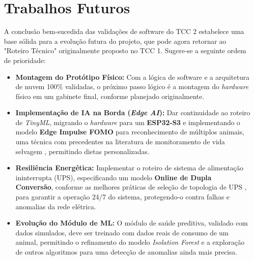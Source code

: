 \section{Trabalhos Futuros}
A conclusão bem-sucedida das validações de software do TCC 2 estabelece uma base sólida para a evolução futura do projeto, que pode agora retornar ao "Roteiro Técnico" originalmente proposto no TCC 1.
Sugere-se a seguinte ordem de prioridade:

\begin{itemize}
    \item \textbf{Montagem do Protótipo Físico:} Com a lógica de software e a arquitetura de nuvem 100\% validadas, o próximo passo lógico é a montagem do \textit{hardware} físico em um gabinete final, conforme planejado originalmente.
    
\item \textbf{Implementação de IA na Borda (\textit{Edge AI}):} Dar continuidade ao roteiro de \textit{TinyML}, migrando o \textit{hardware} para um \textbf{ESP32-S3} e implementando o modelo \textbf{Edge Impulse FOMO} para reconhecimento de múltiplos animais, uma técnica com precedentes na literatura de monitoramento de vida selvagem \cite{lindqvist2023_edge_ml, yolov5_wildlife_detection}, permitindo dietas personalizadas.

\item \textbf{Resiliência Energética:} Implementar o roteiro de sistema de alimentação ininterrupta (UPS), especificando um modelo \textbf{Online de Dupla Conversão}, conforme as melhores práticas de seleção de topologia de UPS \cite{vertiv_ups_types, mitsubishi_ups_types}, para garantir a operação 24/7 do sistema, protegendo-o contra falhas e anomalias da rede elétrica.

\item \textbf{Evolução do Módulo de ML:} O módulo de saúde preditiva, validado com dados simulados, deve ser treinado com dados reais de consumo de um animal, permitindo o refinamento do modelo \textit{Isolation Forest} e a exploração de outros algoritmos para uma detecção de anomalias ainda mais precisa.
\end{itemize}